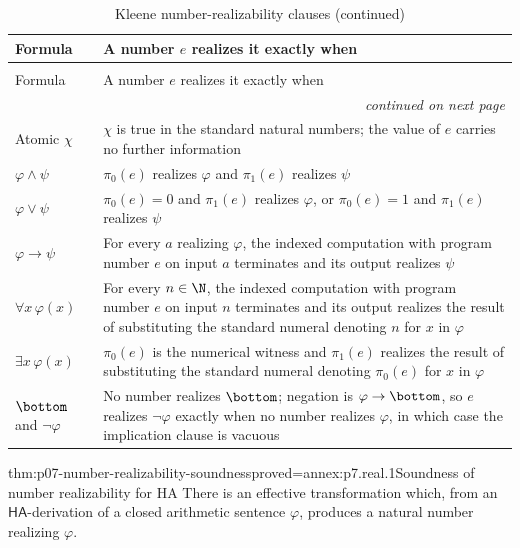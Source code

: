 \begingroup\small
\begin{longtable}{@{}p{}p{}@{}}
\caption{Kleene number-realizability clauses.}
\label{tab:p07-number-realizability}\\
\toprule
Formula & A number \(e\) realizes it exactly when \\
\midrule
\endfirsthead
\caption[]{Kleene number-realizability clauses (continued)}\\
\toprule
Formula & A number \(e\) realizes it exactly when \\
\midrule
\endhead
\midrule\multicolumn{2}{r}{\emph{continued on next page}}\\
\endfoot
\endlastfoot
Atomic \(\chi\) & \(\chi\) is true in the standard natural numbers; the value of
\(e\) carries no further information \\
\(\varphi\land\psi\) & \(\pi_0(e)\) realizes \(\varphi\) and
\(\pi_1(e)\) realizes \(\psi\) \\
\(\varphi\lor\psi\) & \(\pi_0(e)=0\) and \(\pi_1(e)\) realizes \(\varphi\), or
\(\pi_0(e)=1\) and \(\pi_1(e)\) realizes \(\psi\) \\
\(\varphi\to\psi\) & For every \(a\) realizing \(\varphi\), the indexed
computation with program number \(e\) on input \(a\) terminates and its output
realizes \(\psi\) \\
\(\forall x\,\varphi(x)\) & For every \(n\in\N\), the indexed computation
with program number \(e\) on input \(n\) terminates and its output realizes the
result of substituting the standard numeral denoting \(n\) for \(x\) in
\(\varphi\) \\
\(\exists x\,\varphi(x)\) & \(\pi_0(e)\) is the numerical witness and
\(\pi_1(e)\) realizes the result of substituting the standard numeral denoting
\(\pi_0(e)\) for \(x\) in \(\varphi\) \\
\(\bottom\) and \(\neg\varphi\) & No number realizes \(\bottom\); negation is
\(\varphi\to\bottom\), so \(e\) realizes \(\neg\varphi\) exactly when no
number realizes \(\varphi\), in which case the implication clause is vacuous \\
\bottomrule
\end{longtable}
\endgroup

\begin{hbtheorem}{thm:p07-number-realizability-soundness}{proved=annex:p7.real.1}{Soundness of number realizability for HA}
There is an effective transformation which, from an
\(\mathsf{HA}\)-derivation of a closed arithmetic sentence \(\varphi\), produces a
natural number realizing \(\varphi\).
\end{hbtheorem}

